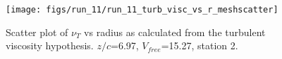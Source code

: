 \begin{figure}[H]
\centering
\texttt{[image: figs/run\_11/run\_11\_turb\_visc\_vs\_r\_meshscatter]}
\caption{Scatter plot of $\nu_T$ vs radius as calculated from the turbulent viscosity hypothesis. $z/c$=6.97, $V_{free}$=15.27, station 2.}
\label{fig:run_11_turb_visc_vs_r_meshscatter}
\end{figure}


